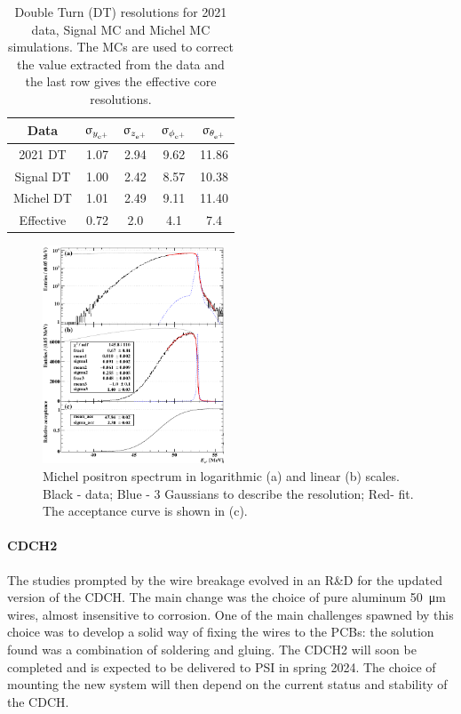 \begin{refsection}
        \begin{table}
            \centering
            \begin{tabular}{ccccc}
                \hline
                Data & $\upsigma_{y_{\text{e}^+}}$ & $\upsigma_{z_{\text{e}^+}}$ & $\upsigma_{\phi_{\text{e}^+}}$ & $\upsigma_{\theta_{\text{e}^+}}$\\
                \hline
                \hline
                2021 DT& 1.07 & 2.94 & 9.62 & 11.86\\
                Signal DT& 1.00 & 2.42 & 8.57 & 10.38\\
                Michel DT& 1.01 & 2.49 & 9.11 & 11.40\\
                \hline
                Effective & 0.72 & 2.0 & 4.1 & 7.4\\
            \end{tabular}
            \caption[CDCH: resolutions]{Double Turn (DT) resolutions for 2021 data, Signal MC and Michel MC simulations. The MCs are used to correct the value extracted from the data and the last row gives the effective core resolutions.}
            \label{tab:CDCH:resolution}
        \end{table}

        \begin{figure}
            \centering
            \includegraphics[width = 0.48\textwidth]{Figures/MEG/CDCH_michelfit.png}
            \caption[CDCH: Michel fit]{Michel positron spectrum in logarithmic (a) and linear (b) scales. Black - data; Blue - 3 Gaussians to describe the resolution; Red- fit. The acceptance curve is shown in (c).}
            \label{fig:MEGII:CDCH:michel}
        \end{figure}

        \paragraph{CDCH2} The studies prompted by the wire breakage evolved in an R\&D for the updated version of the CDCH. The main change was the choice of pure aluminum \SI{50}{\micro m} wires,  almost insensitive to corrosion.
        One of the main challenges spawned by this choice was to develop a solid way of fixing the wires to the PCBs: the solution found was a combination of soldering and gluing.
        The CDCH2 will soon be completed and is expected to be delivered to PSI in spring 2024.
        The choice of mounting the new system will then depend on the current status and stability of the CDCH.


\end{refsection}
